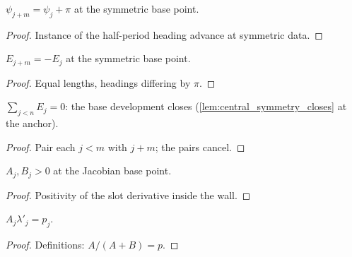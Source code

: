 \begin{lemma}
  \label{lem:heading_jacobian_base_len_add_half}
  $\psi_{j+m} = \psi_j + \pi$ at the symmetric base point.
\end{lemma}
\begin{proof}

\leanok
  Instance of the half-period heading advance at symmetric data.
\end{proof}

\begin{lemma}
  \label{lem:jacobian_edge_add_half}
  $E_{j+m} = -E_j$ at the symmetric base point.
\end{lemma}
\begin{proof}

\leanok
  Equal lengths, headings differing by $\pi$.
\end{proof}

\begin{lemma}
  \label{lem:sum_jacobian_edge_eq_zero}
  $\sum_{j<n} E_j = 0$: the base development closes
  (\cref{lem:central_symmetry_closes} at the anchor).
\end{lemma}
\begin{proof}

\leanok
  Pair each $j < m$ with $j + m$; the pairs cancel.
\end{proof}

\begin{lemma}
  \label{lem:jacobian_slot_pos}
  $A_j, B_j > 0$ at the Jacobian base point.
\end{lemma}
\begin{proof}

\leanok
  Positivity of the slot derivative inside the wall.
\end{proof}

\begin{lemma}\leanok
[share relation $A\lambda' = p$]
  \label{lem:tail_slot_mul_lambda}
  $A_j \lambda'_j = p_j$.
\end{lemma}
\begin{proof}

\leanok
  Definitions: $A/(A+B) = p$.
\end{proof}

